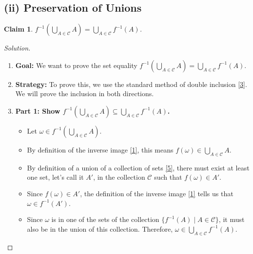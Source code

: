 \documentclass[11pt,a4paper]{article}
\newtheorem{lemma}{Claim}
\newenvironment{solution}{\begin{proof}[Solution]}{\end{proof}}
\begin{document}
\subsection*{(ii) Preservation of Unions}

\begin{lemma}
$f^{-1}\left(\bigcup_{A \in \mathcal{C}} A\right) = \bigcup_{A \in \mathcal{C}} f^{-1}(A)$.
\end{lemma}

\begin{solution}
\begin{enumerate}
    \item \textbf{Goal:} We want to prove the set equality $f^{-1}\left(\bigcup_{A \in \mathcal{C}} A\right) = \bigcup_{A \in \mathcal{C}} f^{-1}(A)$.

    \item \textbf{Strategy:} To prove this, we use the standard method of double inclusion \hyperlink{note3}{[3]}. We will prove the inclusion in both directions.

    \item \textbf{Part 1: Show $f^{-1}\left(\bigcup_{A \in \mathcal{C}} A\right) \subseteq \bigcup_{A \in \mathcal{C}} f^{-1}(A)$.}
    \begin{itemize}
        \item Let $\omega \in f^{-1}\left(\bigcup_{A \in \mathcal{C}} A\right)$.
        \item By definition of the inverse image \hyperlink{note1}{[1]}, this means $f(\omega) \in \bigcup_{A \in \mathcal{C}} A$.
        \item By definition of a union of a collection of sets \hyperlink{note5}{[5]}, there must exist at least one set, let's call it $A'$, in the collection $\mathcal{C}$ such that $f(\omega) \in A'$.
        \item Since $f(\omega) \in A'$, the definition of the inverse image \hyperlink{note1}{[1]} tells us that $\omega \in f^{-1}(A')$.
        \item Since $\omega$ is in one of the sets of the collection $\{f^{-1}(A) \mid A \in \mathcal{C}\}$, it must also be in the union of this collection. Therefore, $\omega \in \bigcup_{A \in \mathcal{C}} f^{-1}(A)$.
    \end{itemize}


\end{enumerate}
\end{solution}
\end{document}
